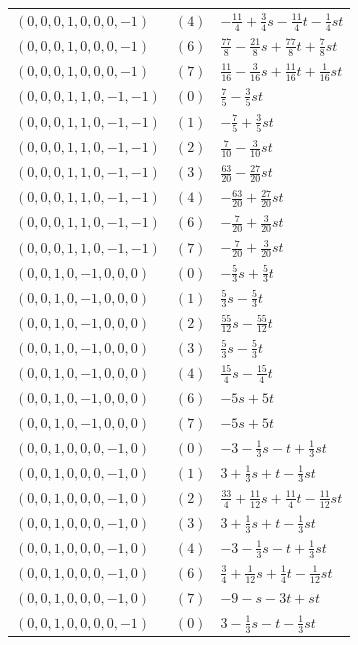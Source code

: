 \begin{longtable}{@{}lll@{}}
$(0,0,0,1,0,0,0,-1)$ & $(4)$ & $-\frac{11}{4}+\frac{3}{4}s-\frac{11}{4}t-\frac{1}{4}st$\\
$(0,0,0,1,0,0,0,-1)$ & $(6)$ & $\frac{77}{8}-\frac{21}{8}s+\frac{77}{8}t+\frac{7}{8}st$\\
$(0,0,0,1,0,0,0,-1)$ & $(7)$ & $\frac{11}{16}-\frac{3}{16}s+\frac{11}{16}t+\frac{1}{16}st$\\
$(0,0,0,1,1,0,-1,-1)$ & $(0)$ & $\frac{7}{5}-\frac{3}{5}st$\\
$(0,0,0,1,1,0,-1,-1)$ & $(1)$ & $-\frac{7}{5}+\frac{3}{5}st$\\
$(0,0,0,1,1,0,-1,-1)$ & $(2)$ & $\frac{7}{10}-\frac{3}{10}st$\\
$(0,0,0,1,1,0,-1,-1)$ & $(3)$ & $\frac{63}{20}-\frac{27}{20}st$\\
$(0,0,0,1,1,0,-1,-1)$ & $(4)$ & $-\frac{63}{20}+\frac{27}{20}st$\\
$(0,0,0,1,1,0,-1,-1)$ & $(6)$ & $-\frac{7}{20}+\frac{3}{20}st$\\
$(0,0,0,1,1,0,-1,-1)$ & $(7)$ & $-\frac{7}{20}+\frac{3}{20}st$\\
$(0,0,1,0,-1,0,0,0)$ & $(0)$ & $-\frac{5}{3}s+\frac{5}{3}t$\\
$(0,0,1,0,-1,0,0,0)$ & $(1)$ & $\frac{5}{3}s-\frac{5}{3}t$\\
$(0,0,1,0,-1,0,0,0)$ & $(2)$ & $\frac{55}{12}s-\frac{55}{12}t$\\
$(0,0,1,0,-1,0,0,0)$ & $(3)$ & $\frac{5}{3}s-\frac{5}{3}t$\\
$(0,0,1,0,-1,0,0,0)$ & $(4)$ & $\frac{15}{4}s-\frac{15}{4}t$\\
$(0,0,1,0,-1,0,0,0)$ & $(6)$ & $-5s+5t$\\
$(0,0,1,0,-1,0,0,0)$ & $(7)$ & $-5s+5t$\\
$(0,0,1,0,0,0,-1,0)$ & $(0)$ & $-3-\frac{1}{3}s-t+\frac{1}{3}st$\\
$(0,0,1,0,0,0,-1,0)$ & $(1)$ & $3+\frac{1}{3}s+t-\frac{1}{3}st$\\
$(0,0,1,0,0,0,-1,0)$ & $(2)$ & $\frac{33}{4}+\frac{11}{12}s+\frac{11}{4}t-\frac{11}{12}st$\\
$(0,0,1,0,0,0,-1,0)$ & $(3)$ & $3+\frac{1}{3}s+t-\frac{1}{3}st$\\
$(0,0,1,0,0,0,-1,0)$ & $(4)$ & $-3-\frac{1}{3}s-t+\frac{1}{3}st$\\
$(0,0,1,0,0,0,-1,0)$ & $(6)$ & $\frac{3}{4}+\frac{1}{12}s+\frac{1}{4}t-\frac{1}{12}st$\\
$(0,0,1,0,0,0,-1,0)$ & $(7)$ & $-9-s-3t+st$\\
$(0,0,1,0,0,0,0,-1)$ & $(0)$ & $3-\frac{1}{3}s-t-\frac{1}{3}st$\\

\end{longtable}

